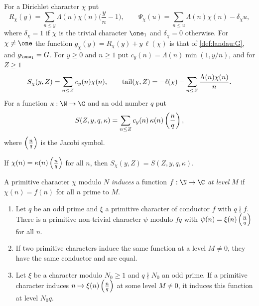 \begin{definition}\label{pf:top-supply:primesums}
For a Dirichlet character $\chi$ put
\[
R_\chi(y)=\sum_{n\le y}\Lambda(n)\chi(n)\Big(\frac yn-1\Big),\qquad
\Psi_\chi(u)=\sum_{n\le u}\Lambda(n)\chi(n)-\delta_\chi u,
\]
where $\delta_\chi=1$ if $\chi$ is the trivial character $\one_1$ and $\delta_\chi=0$ otherwise. For $\chi\ne\one$ the
function $g_\chi(y)=R_\chi(y)+y\,\ell(\chi)$ is that of \cref{def:landau:G}, and $g_{\one_1}=G$. For $y\ge0$ and
$n\ge1$ put $c_y(n)=\Lambda(n)\min(1,y/n)$, and for $Z\ge1$
\begin{equation}\label{eq:pf:top-supply:S}
S_\chi(y,Z)=\sum_{n\le Z}c_y(n)\chi(n),\qquad
\operatorname{tail}(\chi,Z)=-\ell(\chi)-\sum_{n\le Z}\frac{\Lambda(n)\chi(n)}{n}.
\end{equation}
For a function $\kappa:\N\to\C$ and an odd number $q$ put
\begin{equation}\label{eq:pf:top-supply:Sq}
S(Z,y,q,\kappa)=\sum_{n\le Z}c_y(n)\,\kappa(n)\left(\frac{n}{q}\right) ,
\end{equation}
where $\left(\frac{n}{q}\right)$ is the Jacobi symbol.
  
 
  
\end{definition}

If $\chi(n)=\kappa(n)\left(\frac{n}{q}\right)$ for all $n$, then $S_\chi(y,Z)=S(Z,y,q,\kappa)$.

A primitive character $\chi$ modulo $N$ \emph{induces} a function $f:\N\to\C$ \emph{at level} $M$ if
$\chi(n)=f(n)$ for all $n$ prime to $M$.

\begin{lemma}\label{pf:top-supply:twistprim}
\begin{enumerate}[label=(\roman*)]
\item Let $q$ be an odd prime and $\xi$ a primitive character of conductor $f$ with $q\nmid f$. There is a primitive
non-trivial character $\psi$ modulo $fq$ with $\psi(n)=\xi(n)\left(\frac{n}{q}\right)$ for all $n$.
\item If two primitive characters induce the same function at a level $M\ne0$, they have the same conductor and are
equal.
\item Let $\xi$ be a character modulo $N_0\ge1$ and $q\nmid N_0$ an odd prime. If a primitive character induces
$n\mapsto\xi(n)\left(\frac{n}{q}\right)$ at some level $M\ne0$, it induces this function at level $N_0q$.
\end{enumerate}
  
\end{lemma}

